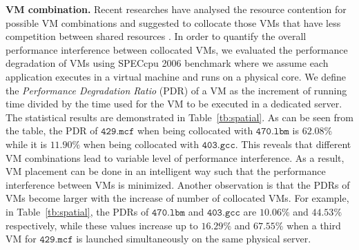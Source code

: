 \documentclass[10pt,journal]{IEEEtran}
\begin{document}
\textbf{VM combination.} 
Recent researches have analysed the resource contention for possible VM combinations and suggested to collocate those VMs that have less competition between shared resources \cite{Govindan11, Chiang11, Mars11, Roytman13, Kim13, Verboven13}. In order to quantify the overall performance interference between collocated VMs, we evaluated the performance degradation of VMs using SPECcpu 2006 benchmark \cite{SPEC06} where we assume each application executes in a virtual machine and runs on a physical core. We define the \textit{Performance Degradation Ratio} (PDR) of a VM as the increment of running time divided by the time used for the VM to be executed in a dedicated server. The statistical results are demonstrated in Table~\ref{tb:spatial}. As can be seen from the table, the PDR of $\mathtt{429.mcf}$ when being collocated with $\mathtt{470.lbm}$ is $62.08\%$ while it is $11.90\%$ when being collocated with $\mathtt{403.gcc}$. This reveals that different VM combinations lead to variable level of performance interference. As a result, VM placement can be done in an intelligent way such that the performance interference between VMs is minimized. Another observation is that the PDRs of VMs become larger with the increase of number of collocated VMs. For example, in Table~\ref{tb:spatial}, the PDRs of $\mathtt{470.lbm}$ and $\mathtt{403.gcc}$ are $10.06\%$ and $44.53\%$ respectively, while these values increase up to $16.29\%$ and $67.55\%$ when a third VM for $\mathtt{429.mcf}$ is launched simultaneously on the same physical server.
\end{document}
